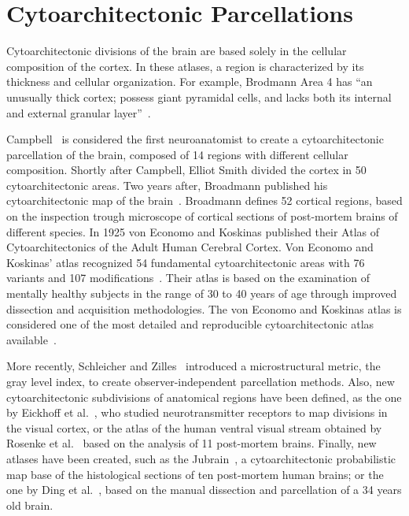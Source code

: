 \section{Cytoarchitectonic Parcellations}
\label{sec:cytoarchitecture}

Cytoarchitectonic divisions of the brain are based solely in the cellular
composition of the cortex. In these atlases, a region is characterized by its
thickness and cellular organization. For example, Brodmann Area 4 has
``an unusually thick cortex; possess giant pyramidal cells,
and lacks both its internal and external granular layer''~\cite{Brodmann1909}.

Campbell~\cite{Campbell1905} is considered the first neuroanatomist to create
a cytoarchitectonic parcellation of the brain, composed of 14 regions with
different cellular composition. Shortly after Campbell, Elliot Smith\cite{Smith1907}
divided the cortex in 50 cytoarchitectonic areas. Two years after, Broadmann
published his cytoarchitectonic map of the brain~\cite{Brodmann1909}. Broadmann
defines 52 cortical regions, based
on the inspection trough microscope of cortical sections of post-mortem
brains of different species. In 1925 von Economo and Koskinas published
their Atlas of Cytoarchitectonics of the Adult Human Cerebral Cortex\cite{VonEconomo1925}.
Von Economo and Koskinas' atlas recognized 54 fundamental cytoarchitectonic areas with
76 variants and 107 modifications~\cite{Triarhou2007}. Their atlas is based on the
examination of mentally healthy subjects in the range of 30 to 40 years of age
through improved dissection and acquisition methodologies. The von Economo and 
Koskinas atlas is considered one of the most detailed and reproducible cytoarchitectonic
atlas available~\cite{Peden1947}.

More recently, Schleicher and Zilles~\cite{Schleicher1990} introduced a microstructural
metric, the gray level index, to create observer-independent parcellation methods.
Also, new cytoarchitectonic subdivisions of anatomical regions have been defined,
as the one by Eickhoff et al.~\cite{Eickhoff2008}, who studied neurotransmitter
receptors to map divisions in the visual cortex, or the atlas of the human
ventral visual stream obtained by Rosenke et al.~\cite{Rosenke2018} based on the
analysis of 11 post-mortem brains. Finally, new atlases have been created, such
as the  Jubrain~\cite{Mohlberg2012}, a cytoarchitectonic probabilistic map base of the
histological sections of ten post-mortem human brains; or the one by
Ding et al.~\cite{Ding2016}, based on the manual dissection and parcellation
of a 34 years old brain.

